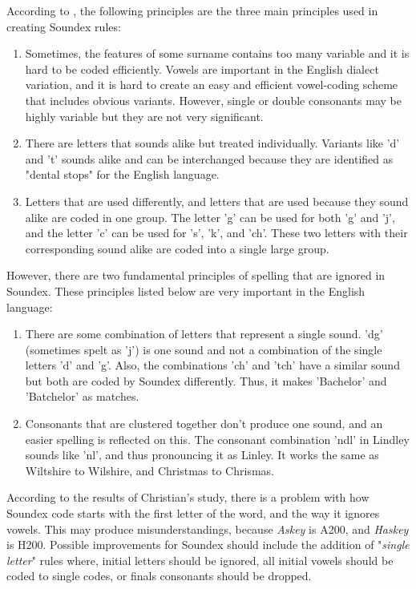 \documentclass[12pt]{book}
\begin{document}
\begin{enumerate}
According to \cite{christian1998soundex}, the following principles are the three main principles used in creating Soundex rules:
\begin{enumerate}
	\item Sometimes, the features of some surname contains too many variable and it is hard to be coded efficiently. Vowels are important in the English dialect variation, and it is hard to create an easy and efficient vowel-coding scheme that includes obvious variants. However, single or double consonants may be highly variable but they are not very significant.
	\item There are letters that sounds alike but treated individually. Variants like 'd' and 't' sounds alike and can be interchanged because they are identified as "dental stops" for the English language.
	\item Letters that are used differently, and letters that are used because they sound alike are coded in one group. The letter 'g' can be used for both 'g' and 'j', and the letter 'c' can be used for 's', 'k', and 'ch'. These two letters with their corresponding sound alike are coded into a single large group.
\end{enumerate}

However, there are two fundamental principles of spelling that are ignored in Soundex. These principles listed below are very important in the English language:
\begin{enumerate}
	\item There are some combination of letters that represent a single sound. 'dg' (sometimes spelt as 'j') is one sound and not a combination of the single letters 'd' and 'g'. Also, the combinations 'ch' and 'tch' have a similar sound but both are coded by Soundex differently. Thus, it makes 'Bachelor' and 'Batchelor' as matches.
	\item Consonants that are clustered together don't produce one sound, and an easier spelling is reflected on this. The consonant combination 'ndl' in Lindley sounds like 'nl', and thus pronouncing it as Linley. It works the same as Wiltshire to Wilshire, and Christmas to Chrismas.
\end{enumerate}

According to the results of Christian's study, there is a problem with how Soundex code starts with the first letter of the word, and the way it ignores vowels. This may produce misunderstandings, because \textit{Askey} is A200, and \textit{Haskey} is H200. Possible improvements for Soundex should include the addition of "\textit{single letter}" rules where, initial letters should be ignored, all initial vowels should be coded to single codes, or finals consonants should be dropped.



\end{enumerate}
\end{document}

